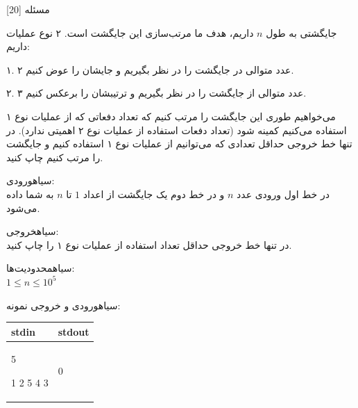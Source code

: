‌مسئله [20]

جایگشتی به طول $n$ داریم، هدف ما مرتب‌سازی این جایگشت است. ۲ نوع عملیات داریم:


۱. ۲ عدد متوالی در جایگشت را در نظر بگیریم و جایشان را عوض کنیم.

۲. ۳ عدد متوالی از جایگشت را در نظر بگیریم و ترتیبشان را برعکس کنیم.

می‌خواهیم طوری این جایگشت را مرتب کنیم که تعداد دفعاتی که از عملیات نوع ۱ استفاده می‌کنیم کمینه شود (تعداد دفعات استفاده از عملیات نوع ۲ اهمیتی ندارد).
در تنها خط خروجی حداقل تعدادی که می‌توانیم از عملیات نوع ۱ استفاده کنیم و جایگشت را مرتب کنیم چاپ کنید.

‌سیاه{ورودی:}\\
در خط اول ورودی عدد $n$
و
در خط دوم یک جایگشت از اعداد $1$ تا $n$ به شما داده می‌شود.

‌سیاه{خروجی:}\\
در تنها خط خروجی حداقل تعداد استفاده از عملیات نوع ۱ را چاپ کنید.

‌سیاه{محدودیت‌ها:}\\
$1\leq n\leq 10^5$


‌سیاه{ورودی و خروجی نمونه:}\\


\begin{latin}
\begin{tabularx}{\textwidth}{|X | X|}
\hline
\textbf{stdin} &
\textbf{stdout}\\
\hline
5

1 2 5 4 3&
0\\
\hline

\end{tabularx}
\end{latin}

